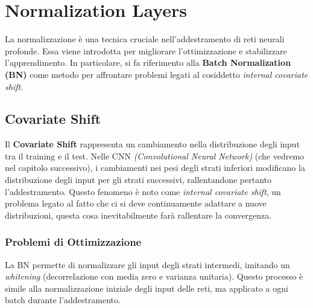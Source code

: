 \chapter{Normalization Layers}
La normalizzazione è una tecnica cruciale nell’addestramento di reti neurali profonde. Essa viene introdotta per migliorare l’ottimizzazione e stabilizzare l'apprendimento. In particolare, si fa riferimento alla \textbf{Batch Normalization (BN)} come metodo per affrontare problemi legati al cosiddetto \textit{internal covariate shift}.

\section{Covariate Shift}
Il \textbf{Covariate Shift} rappresenta un cambiamento nella distribuzione degli input tra il training e il test. Nelle CNN \textit{(Convolutional Neural Network)} (che vedremo nel capitolo successivo), i cambiamenti nei pesi degli strati inferiori modificano la distribuzione degli input per gli strati successivi, rallentandone pertanto l'addestramento. Questo fenomeno è noto come \textit{internal covariate shift}, un problema legato al fatto che ci si deve continuamente adattare a nuove distribuzioni, questa cosa inevitabilmente farà rallentare la convergenza.

\subsection{Problemi di Ottimizzazione}
La BN permette di normalizzare gli input degli strati intermedi, imitando un \textit{whitening} (decorrelazione con media zero e varianza unitaria). Questo processo è simile alla normalizzazione iniziale degli input delle reti, ma applicato a ogni batch durante l’addestramento.

